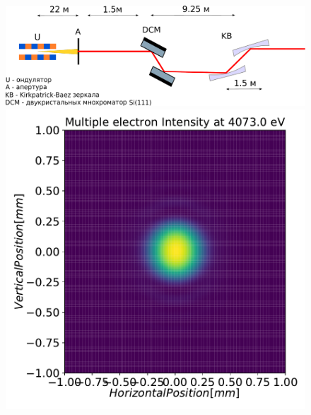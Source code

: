 \begin{figure}[h]
	\begin{minipage}{0.99\textwidth}
	\centering  
	\includegraphics[width=\textwidth]{pic/OptScheme_1-4.pdf}
	\end{minipage}\hfill
	\begin{minipage}{0.3\textwidth}
		\centering
		\includegraphics[width=\textwidth]{pic/3_harm_before_optics_2d.pdf}
	\end{minipage}
	\begin{minipage}{0.3\textwidth}
		\centering

\end{minipage}
\end{figure}

